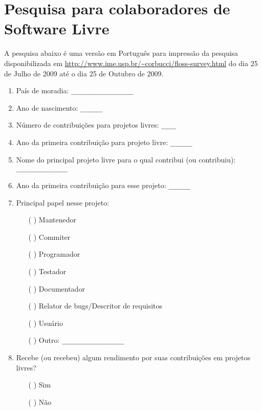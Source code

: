 \chapter{Pesquisa para colaboradores de Software Livre}
\label{ape:OS}

\singlespacing

A pesquisa abaixo é uma versão em Português para impressão da pesquisa
disponibilizada em
\url{http://www.ime.usp.br/~corbucci/floss-survey.html} do dia 25 de
Julho de 2009 até o dia 25 de Outubro de 2009.

\begin{enumerate}
\item País de moradia: \verb=_________________=

\item Ano de nascimento: \verb=______=

\item Número de contribuições para projetos livres: \verb=____=

\item Ano da primeira contribuição para projeto livre: \verb=______=

\item Nome do principal projeto livre para o qual contribui (ou
  contribuiu): \verb= ______________=

\item Ano da primeira contribuição para esse projeto: \verb=______=

\item Principal papel nesse projeto:
  \begin{itemize}
  \item[( )] Mantenedor
  \item[( )] Commiter
  \item[( )] Programador
  \item[( )] Testador
  \item[( )] Documentador
  \item[( )] Relator de bugs/Descritor de requisitos
  \item[( )] Usuário
  \item[( )] Outro: \verb=_________________=
  \end{itemize}

\item Recebe (ou recebeu) algum rendimento por suas contribuições em
  projetos livres?
  \begin{itemize}
  \item[( )] Sim
  \item[( )] Não
  \end{itemize}


\end{enumerate}
